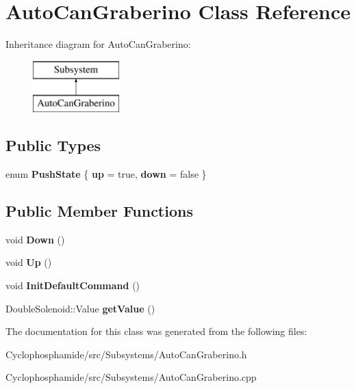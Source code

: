 \hypertarget{class_auto_can_graberino}{}\section{Auto\+Can\+Graberino Class Reference}
\label{class_auto_can_graberino}
Inheritance diagram for Auto\+Can\+Graberino\+:\begin{figure}[H]
\begin{center}
\leavevmode
\includegraphics[height=2.000000cm]{class_auto_can_graberino}
\end{center}
\end{figure}
\subsection*{Public Types}
\begin{DoxyCompactItemize}
\item 
\hypertarget{class_auto_can_graberino_a5949187e3b8793dfe2f737909a77d83c}{}enum {\bfseries Push\+State} \{ {\bfseries up} = true, 
{\bfseries down} = false
 \}\label{class_auto_can_graberino_a5949187e3b8793dfe2f737909a77d83c}

\end{DoxyCompactItemize}
\subsection*{Public Member Functions}
\begin{DoxyCompactItemize}
\item 
\hypertarget{class_auto_can_graberino_aa7120b8f3c2d323fdc33fa39f6245cd0}{}void {\bfseries Down} ()\label{class_auto_can_graberino_aa7120b8f3c2d323fdc33fa39f6245cd0}

\item 
\hypertarget{class_auto_can_graberino_afa4cbfc5d462001da70a8d63be909d41}{}void {\bfseries Up} ()\label{class_auto_can_graberino_afa4cbfc5d462001da70a8d63be909d41}

\item 
\hypertarget{class_auto_can_graberino_a17642fc3fee2e60366272935c3c86874}{}void {\bfseries Init\+Default\+Command} ()\label{class_auto_can_graberino_a17642fc3fee2e60366272935c3c86874}

\item 
\hypertarget{class_auto_can_graberino_a699189deaac0214338b66c2ad1fe036d}{}Double\+Solenoid\+::\+Value {\bfseries get\+Value} ()\label{class_auto_can_graberino_a699189deaac0214338b66c2ad1fe036d}

\end{DoxyCompactItemize}


The documentation for this class was generated from the following files\+:\begin{DoxyCompactItemize}
\item 
Cyclophosphamide/src/\+Subsystems/Auto\+Can\+Graberino.\+h\item 
Cyclophosphamide/src/\+Subsystems/Auto\+Can\+Graberino.\+cpp\end{DoxyCompactItemize}

